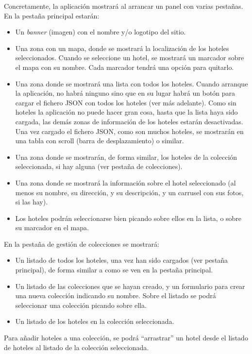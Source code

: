 Concretamente, la aplicación mostrará al arrancar un panel con varias pestañas. En la pestaña principal estarán:

\begin{itemize}
  \item Un \emph{banner} (imagen) con el nombre y/o logotipo del sitio.
  \item Una zona con un mapa, donde se mostrará la localización de los hoteles seleccionados. Cuando se seleccione un hotel, se mostrará un marcador sobre el mapa con su nombre. Cada marcador tendrá una opción para quitarlo.
  \item Una zona donde se mostrará una lista con todos los hoteles. Cuando arranque la aplicación, no habrá ninguno sino que en su lugar habrá un botón para cargar el fichero JSON con todos los hoteles (ver más adelante). Como sin hoteles la aplicación no puede hacer gran cosa, hasta que la lista haya sido cargada, las demás zonas de información de los hoteles estarán desactivadas. Una vez cargado el fichero JSON, como son muchos hoteles, se mostrarán en una tabla con scroll (barra de desplazamiento) o similar.
  \item Una zona donde se mostrarán, de forma similar, los hoteles de la colección seleccionada, si hay alguna (ver pestaña de colecciones).
  \item Una zona donde se mostrará la información sobre el hotel seleccionado (al menos su nombre, su dirección, y su descripción, y un carrusel con sus fotos, si las hay).
  \item Los hoteles podrán seleccionarse bien picando sobre ellos en la lista, o sobre su marcador en el mapa.
\end{itemize}

En la pestaña de gestión de colecciones se mostrará:

\begin{itemize}
  \item Un listado de todos los hoteles, una vez han sido cargados (ver pestaña principal), de forma similar a como se ven en la pestaña principal.
  \item Un listado de las colecciones que se hayan creado, y un formulario para crear una nueva colección indicando su nombre. Sobre el listado se podrá seleccionar una colección picando sobre ella.
  \item Un listado de los hoteles en la colección seleccionada.
\end{itemize}

Para añadir hoteles a una colección, se podrá ``arrastrar'' un hotel desde el listado de hoteles al listado de la colección seleccionada.

